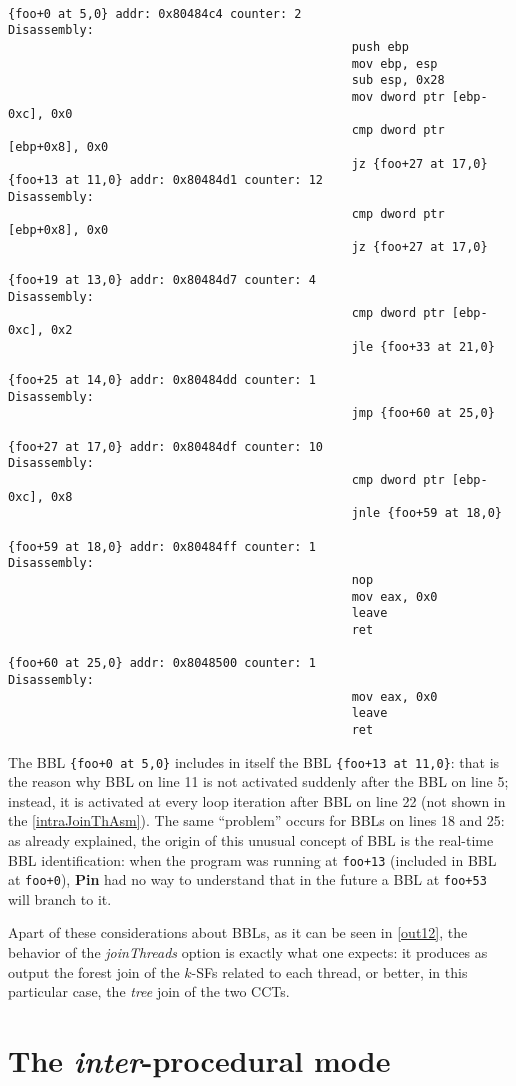 \documentclass[a4paper,10pt]{report}
\begin{document}
\begin{lstlisting}[language={[x86masm]Assembler},
	label=intraJoinThAsm, caption={a part of ``all basic blocks'' table of \texttt{prog5}}]

{foo+0 at 5,0} addr: 0x80484c4 counter: 2
Disassembly:
												push ebp
												mov ebp, esp
												sub esp, 0x28
												mov dword ptr [ebp-0xc], 0x0
												cmp dword ptr [ebp+0x8], 0x0
												jz {foo+27 at 17,0}
{foo+13 at 11,0} addr: 0x80484d1 counter: 12
Disassembly:
												cmp dword ptr [ebp+0x8], 0x0
												jz {foo+27 at 17,0}

{foo+19 at 13,0} addr: 0x80484d7 counter: 4
Disassembly:
												cmp dword ptr [ebp-0xc], 0x2
												jle {foo+33 at 21,0}

{foo+25 at 14,0} addr: 0x80484dd counter: 1
Disassembly:
												jmp {foo+60 at 25,0}

{foo+27 at 17,0} addr: 0x80484df counter: 10
Disassembly:
												cmp dword ptr [ebp-0xc], 0x8
												jnle {foo+59 at 18,0}

{foo+59 at 18,0} addr: 0x80484ff counter: 1
Disassembly:
												nop
												mov eax, 0x0
												leave
												ret

{foo+60 at 25,0} addr: 0x8048500 counter: 1
Disassembly:
												mov eax, 0x0
												leave
												ret

\end{lstlisting}

The BBL \verb|{foo+0 at 5,0}| includes in itself the BBL \verb|{foo+13 at 11,0}|:
that is the reason why BBL on line 11 is not activated suddenly
after the BBL on line 5; instead, it is activated at every loop iteration
after BBL on line 22 (not shown in the \cref{intraJoinThAsm}).
The same ``problem'' occurs for BBLs on lines 18 and 25:
as already explained, the origin of this unusual concept of BBL is the real-time BBL
identification: when the program was running at \verb|foo+13| (included in BBL at \verb|foo+0|),
\textbf{Pin} had no way to understand that in the future a BBL at \verb|foo+53| will
branch to it.

Apart of these considerations about BBLs, as it can be seen in \cref{out12},
the behavior of the \emph{joinThreads} option is exactly what one expects:
it produces as output the forest join of the $k$-SFs related to each thread,
or better, in this particular case, the \emph{tree} join of the two CCTs.

\section{The \emph{inter}-procedural mode}
\end{document}
